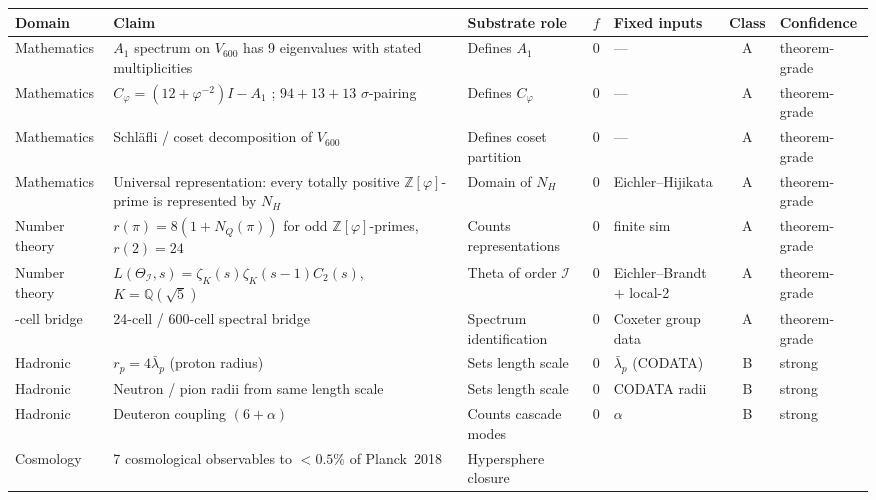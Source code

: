 \documentclass[11pt,a4paper]{article}
\newcommand{\II}{\mathcal{I}}
\newcommand{\Vsix}{V_{600}}
\newcommand{\Cphi}{C_\varphi}
\newcommand{\NH}{N_H}
\newcommand{\Q}{\mathbb{Q}}
\newcommand{\Z}{\mathbb{Z}}
\begin{document}
\noindent
\begin{small}
\begin{longtable}{p{2.3cm}p{4.0cm}p{3.2cm}cp{2.0cm}cl}
\toprule
\textbf{Domain} & \textbf{Claim} & \textbf{Substrate role}
& \textbf{$f$} & \textbf{Fixed inputs} & \textbf{Class}
& \textbf{Confidence} \\
\midrule
\endhead
Mathematics & $A_1$ spectrum on $\Vsix$ has 9 eigenvalues with stated multiplicities
            & Defines $A_1$
            & 0 & --- & A & theorem-grade \\
\addlinespace
Mathematics & $\Cphi = (12+\varphi^{-2})I - A_1$ ; $94+13+13$ $\sigma$-pairing
            & Defines $\Cphi$
            & 0 & --- & A & theorem-grade \\
\addlinespace
Mathematics & Schl\"afli / coset decomposition of $\Vsix$
            & Defines coset partition
            & 0 & --- & A & theorem-grade \\
\addlinespace
Mathematics & Universal representation: every totally positive $\Z[\varphi]$-prime is represented by $\NH$
            & Domain of $\NH$
            & 0 & Eichler--Hijikata
            & A & theorem-grade \\
\addlinespace
Number theory & $r(\pi) = 8(1+N_Q(\pi))$ for odd $\Z[\varphi]$-primes, $r(2) = 24$
            & Counts representations
            & 0 & finite sim & A & theorem-grade \\
\addlinespace
Number theory & $L(\Theta_\II,s) = \zeta_K(s)\zeta_K(s-1)C_2(s)$, $K = \Q(\sqrt 5)$
            & Theta of order $\II$
            & 0 & Eichler--Brandt + local-2
            & A & theorem-grade \\
\addlinespace
24-cell bridge & 24-cell / 600-cell spectral bridge
            & Spectrum identification
            & 0 & Coxeter group data
            & A & theorem-grade \\
\addlinespace
Hadronic & $r_p = 4\bar\lambda_p$ (proton radius)
            & Sets length scale
            & 0 & $\bar\lambda_p$ (CODATA)
            & B & strong \\
\addlinespace
Hadronic & Neutron / pion radii from same length scale
            & Sets length scale
            & 0 & CODATA radii
            & B & strong \\
\addlinespace
Hadronic & Deuteron coupling $(6+\alpha)$
            & Counts cascade modes
            & 0 & $\alpha$
            & B & strong \\
\addlinespace
Cosmology & 7 cosmological observables to $<0.5\%$ of Planck~2018
            & Hypersphere closure

\end{longtable}
\end{small}
\end{document}

